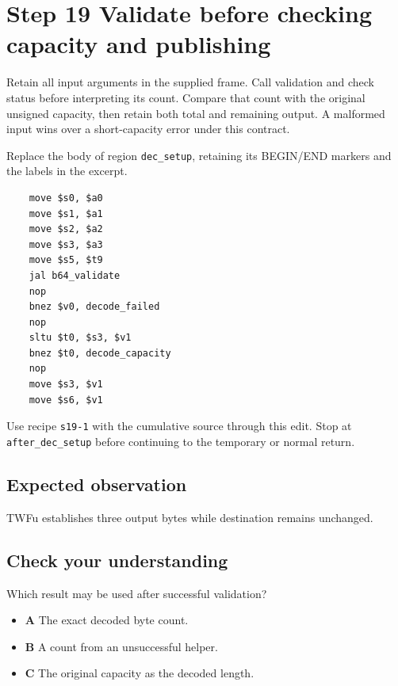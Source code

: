 \section{Step 19 Validate before checking capacity and publishing}\label{base64-s19}

Retain all input arguments in the supplied frame. Call validation and check status before interpreting its count. Compare that count with the original unsigned capacity, then retain both total and remaining output. A malformed input wins over a short-capacity error under this contract.

Replace the body of region \texttt{dec\_setup}, retaining its BEGIN/END markers and the labels in the excerpt.

\begin{verbatim}
    move $s0, $a0
    move $s1, $a1
    move $s2, $a2
    move $s3, $a3
    move $s5, $t9
    jal b64_validate
    nop
    bnez $v0, decode_failed
    nop
    sltu $t0, $s3, $v1
    bnez $t0, decode_capacity
    nop
    move $s3, $v1
    move $s6, $v1
\end{verbatim}

Use recipe \texttt{s19-1} with the cumulative source through this edit. Stop at \texttt{after\_dec\_setup} before continuing to the temporary or normal return.

\subsection{Expected observation}
TWFu establishes three output bytes while destination remains unchanged.

\subsection{Check your understanding}
Which result may be used after successful validation?

\begin{itemize}
\item \textbf{A} The exact decoded byte count.
\item \textbf{B} A count from an unsuccessful helper.
\item \textbf{C} The original capacity as the decoded length.
\end{itemize}
